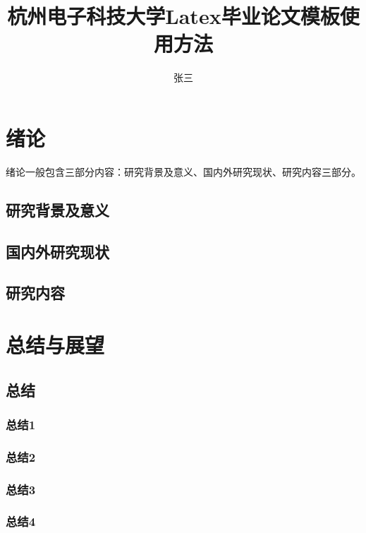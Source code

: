 \documentclass[master,draft]{styles/hdu-thesis}
\title{杭州电子科技大学Latex毕业论文模板使用方法}{Munual of latex on thesis for HDU}
\author{张三}{San Zhang}%
\begin{document}
\makecover
\makedeclaration




\ifdraft{
  \listoftodos
}{}
\figurelist

\tablelist


\tableofcontents

\chapter{绪论}
  绪论一般包含三部分内容：研究背景及意义、国内外研究现状、研究内容三部分。
  \section{研究背景及意义}
  \section{国内外研究现状}
  \section{研究内容}

\ifdraft{
  
}{}

\chapter{总结与展望}
  \section{总结}
    \subsection{总结1}
    \subsection{总结2}
    \subsection{总结3}
    \subsection{总结4}
\end{document}
